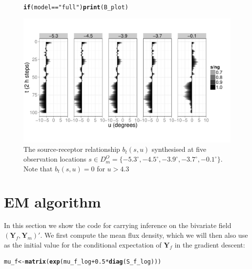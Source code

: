 \documentclass[a4paper,11pt]{article}\usepackage[]{graphicx}\usepackage[]{color}
\makeatletter
\def\maxwidth{ %
  \ifdim\Gin@nat@width>\linewidth
    \linewidth
  \else
    \Gin@nat@width
  \fi
}
\newcommand{\hlnum}[1]{\textcolor[rgb]{0.686,0.059,0.569}{#1}}%
\newcommand{\hlstr}[1]{\textcolor[rgb]{0.192,0.494,0.8}{#1}}%
\newcommand{\hlopt}[1]{\textcolor[rgb]{0,0,0}{#1}}%
\newcommand{\hlstd}[1]{\textcolor[rgb]{0.345,0.345,0.345}{#1}}%
\newcommand{\hlkwa}[1]{\textcolor[rgb]{0.161,0.373,0.58}{\textbf{#1}}}%
\newcommand{\hlkwb}[1]{\textcolor[rgb]{0.69,0.353,0.396}{#1}}%
\newcommand{\hlkwd}[1]{\textcolor[rgb]{0.737,0.353,0.396}{\textbf{#1}}}%
\newenvironment{kframe}{%
 \def\at@end@of@kframe{}%
 \ifinner\ifhmode%
  \def\at@end@of@kframe{\end{minipage}}%
  \begin{minipage}{\columnwidth}%
 \fi\fi%
 \def\FrameCommand##1{\hskip\@totalleftmargin \hskip-\fboxsep
 \colorbox{shadecolor}{##1}\hskip-\fboxsep
     \hskip-\linewidth \hskip-\@totalleftmargin \hskip\columnwidth}%
 \MakeFramed {\advance\hsize-\width
   \@totalleftmargin\z@ \linewidth\hsize
   \@setminipage}}%
 {\par\unskip\endMakeFramed%
 \at@end@of@kframe}
\newenvironment{knitrout}{}{} %
\newcommand{\Yvec}{\mathbf{Y}}
\makeatother
\begin{document}
\begin{figure}
\begin{center}
\begin{knitrout}
\color{fgcolor}\begin{kframe}
\begin{alltt}
\hlkwa{if}\hlstd{(model} \hlopt{==} \hlstr{"full"}\hlstd{)} \hlkwd{print}\hlstd{(B_plot)}
\end{alltt}
\end{kframe}
\includegraphics[width=\maxwidth]{figure/B-plot-1} 

\end{knitrout}
\end{center}
\caption{ The source-receptor relationship $b_t(s,u)$ synthesised at five observation locations $s \in D^O_m = \{-5.3^\circ, -4.5^\circ,-3.9^\circ,-3.7^\circ,-0.1^\circ \}$. Note that $b_t(s,u) = 0$ for $u > 4.3$}
\label{fig:B}
\end{figure}






\section{EM algorithm}

In this section we show the code for carrying inference on the bivariate field $(\Yvec_f,\Yvec_m)'$. We first compute the mean flux density, which we will then also use as the initial value for the conditional expectation of $\Yvec_f$ in the gradient descent:


\begin{knitrout}
\color{fgcolor}\begin{kframe}
\begin{alltt}
\hlstd{mu_f} \hlkwb{<-} \hlkwd{matrix}\hlstd{(}\hlkwd{exp}\hlstd{(mu_f_log} \hlopt{+} \hlnum{0.5}\hlopt{*}\hlkwd{diag}\hlstd{(S_f_log)))}
\end{alltt}
\end{kframe}
\end{knitrout}
\end{document}
